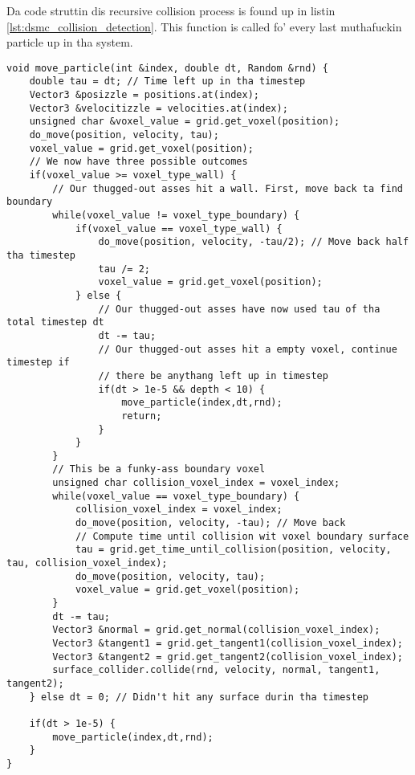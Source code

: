 Da code struttin dis recursive collision process is found up in listin \ref{lst:dsmc_collision_detection}. This function is called fo' every last muthafuckin particle up in tha system.
\begin{lstlisting}[caption=Da collision detection algorithm., label=lst:dsmc_collision_detection]
void move_particle(int &index, double dt, Random &rnd) {
    double tau = dt; // Time left up in tha timestep
    Vector3 &posizzle = positions.at(index);
    Vector3 &velocitizzle = velocities.at(index);
    unsigned char &voxel_value = grid.get_voxel(position);
    do_move(position, velocity, tau);
    voxel_value = grid.get_voxel(position);
    // We now have three possible outcomes
    if(voxel_value >= voxel_type_wall) {
        // Our thugged-out asses hit a wall. First, move back ta find boundary
        while(voxel_value != voxel_type_boundary) {
            if(voxel_value == voxel_type_wall) {
                do_move(position, velocity, -tau/2); // Move back half tha timestep
                tau /= 2;
                voxel_value = grid.get_voxel(position);
            } else {
                // Our thugged-out asses have now used tau of tha total timestep dt
                dt -= tau;
                // Our thugged-out asses hit a empty voxel, continue timestep if
                // there be anythang left up in timestep
                if(dt > 1e-5 && depth < 10) {
                    move_particle(index,dt,rnd);
                    return;
                }
            }
        }
        // This be a funky-ass boundary voxel
        unsigned char collision_voxel_index = voxel_index;
        while(voxel_value == voxel_type_boundary) {
            collision_voxel_index = voxel_index;
            do_move(position, velocity, -tau); // Move back
            // Compute time until collision wit voxel boundary surface
            tau = grid.get_time_until_collision(position, velocity, tau, collision_voxel_index); 
            do_move(position, velocity, tau);
            voxel_value = grid.get_voxel(position);
        }
        dt -= tau;
        Vector3 &normal = grid.get_normal(collision_voxel_index);
        Vector3 &tangent1 = grid.get_tangent1(collision_voxel_index);
        Vector3 &tangent2 = grid.get_tangent2(collision_voxel_index);
        surface_collider.collide(rnd, velocity, normal, tangent1, tangent2);
    } else dt = 0; // Didn't hit any surface durin tha timestep

    if(dt > 1e-5) {
        move_particle(index,dt,rnd);
    }
}
\end{lstlisting}
